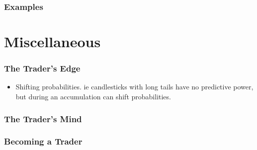 \documentclass{../notes}
\begin{document}
\section{Examples}

\part{Miscellaneous}
\section{The Trader's Edge}
\begin{itemize}
  \item Shifting probabilities. ie candlesticks with long tails have no predictive power, but during an accumulation can shift probabilities.
\end{itemize}
\section{The Trader's Mind}
\section{Becoming a Trader}
\end{document}
